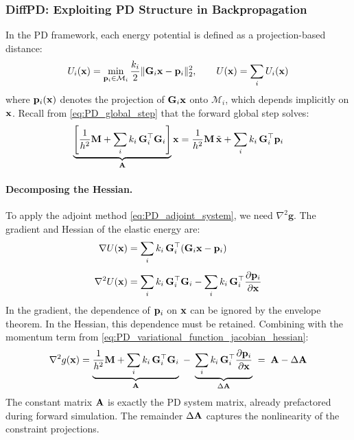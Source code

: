 \subsubsection{DiffPD: Exploiting PD Structure in Backpropagation \cite{du2021diffpd}}

In the PD framework, each energy potential is defined as a projection-based distance:
\begin{equation}
    U_i(\mathbf{x}) = \min_{\mathbf{p}_i \in \mathcal{M}_i} 
    \frac{k_i}{2} \| \mathbf{G}_i \mathbf{x} - \mathbf{p}_i \|^2_2,
    \qquad 
    U(\mathbf{x}) = \sum_i U_i(\mathbf{x})
\end{equation}
where $\mathbf{p}_i(\mathbf{x})$ denotes the projection of $\mathbf{G}_i\mathbf{x}$ onto $\mathcal{M}_i$, which depends implicitly on $\mathbf{x}$. Recall from \eqref{eq:PD_global_step} that the forward global step solves:
\begin{equation}
    \underbrace{\left[ \frac{1}{h^2}\mathbf{M} + \sum_i k_i\, \mathbf{G}_i^\top\mathbf{G}_i \right]}_{\mathbf{A}}
    \mathbf{x} = \frac{1}{h^2}\mathbf{M}\,\tilde{\mathbf{x}} + \sum_i k_i\, \mathbf{G}_i^\top\mathbf{p}_i
\end{equation}

\paragraph{Decomposing the Hessian.} To apply the adjoint method \eqref{eq:PD_adjoint_system}, we need $\nabla^2 \mathbf{g}$. The gradient and Hessian of the elastic energy are:
\begin{align}
    \nabla U(\mathbf{x}) &= \sum_i k_i\, \mathbf{G}_i^\top(\mathbf{G}_i\mathbf{x} - \mathbf{p}_i) \\[1ex]
    \nabla^2 U(\mathbf{x}) &= \sum_i k_i\, \mathbf{G}_i^\top\mathbf{G}_i - \sum_i k_i\, \mathbf{G}_i^\top\frac{\partial \mathbf{p}_i}{\partial \mathbf{x}}
\end{align}
In the gradient, the dependence of $\mathbf{p}_i$ on $\mathbf{x}$ can be ignored by the envelope theorem.
In the Hessian, this dependence must be retained.
\newline Combining with the momentum term from \eqref{eq:PD_variational_function_jacobian_hessian}:
\begin{equation}
    \nabla^2 g(\mathbf{x}) = 
    \underbrace{\frac{1}{h^2}\mathbf{M} + \sum_i k_i\, \mathbf{G}_i^\top\mathbf{G}_i}_{\mathbf{A}} \;-\; 
    \underbrace{\sum_i k_i\, \mathbf{G}_i^\top\frac{\partial \mathbf{p}_i}{\partial \mathbf{x}}}_{\Delta \mathbf{A}} 
    \;=\; \mathbf{A} - \Delta \mathbf{A}
\end{equation}
The constant matrix $\mathbf{A}$ is exactly the PD system matrix, already prefactored during forward simulation. The remainder $\Delta\mathbf{A}$ captures the nonlinearity of the constraint projections.

